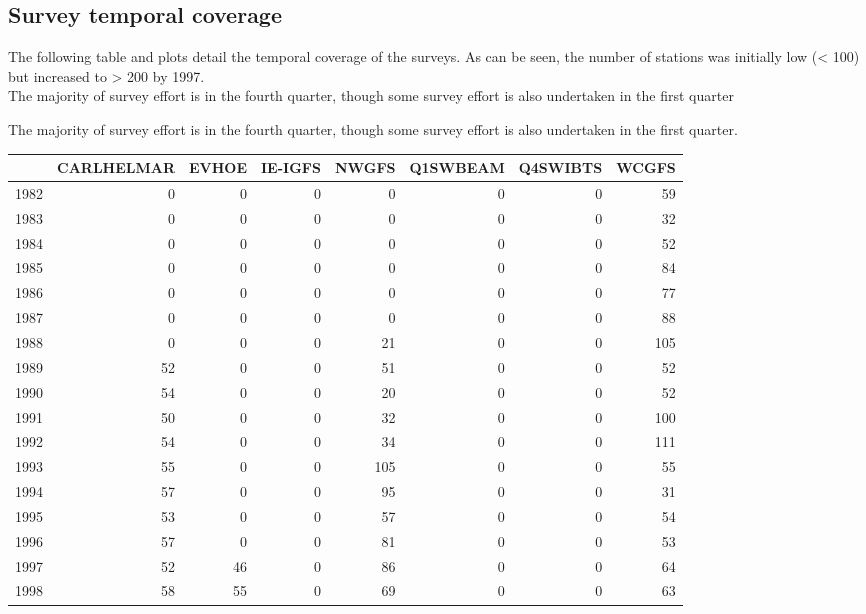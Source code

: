 \documentclass[12pt]{article}\usepackage[]{graphicx}\usepackage[]{color}
\newenvironment{knitrout}{}{} %
\begin{document}
\subsection{Survey temporal coverage}

The following table and plots detail the temporal coverage of the surveys. As
can be seen, the number of stations was initially low (< 100) but increased to
> 200 by 1997.\\

The majority of survey effort is in the fourth quarter, though some survey
effort is also undertaken in the first quarter

The majority of survey effort is in the fourth quarter, though some survey
effort is also undertaken in the first quarter. \\ 

\begin{knitrout}\footnotesize
{}\color{fgcolor}
\begin{tabular}{l|r|r|r|r|r|r|r}
\hline
  & CARLHELMAR & EVHOE & IE-IGFS & NWGFS & Q1SWBEAM & Q4SWIBTS & WCGFS\\
\hline
1982 & 0 & 0 & 0 & 0 & 0 & 0 & 59\\
\hline
1983 & 0 & 0 & 0 & 0 & 0 & 0 & 32\\
\hline
1984 & 0 & 0 & 0 & 0 & 0 & 0 & 52\\
\hline
1985 & 0 & 0 & 0 & 0 & 0 & 0 & 84\\
\hline
1986 & 0 & 0 & 0 & 0 & 0 & 0 & 77\\
\hline
1987 & 0 & 0 & 0 & 0 & 0 & 0 & 88\\
\hline
1988 & 0 & 0 & 0 & 21 & 0 & 0 & 105\\
\hline
1989 & 52 & 0 & 0 & 51 & 0 & 0 & 52\\
\hline
1990 & 54 & 0 & 0 & 20 & 0 & 0 & 52\\
\hline
1991 & 50 & 0 & 0 & 32 & 0 & 0 & 100\\
\hline
1992 & 54 & 0 & 0 & 34 & 0 & 0 & 111\\
\hline
1993 & 55 & 0 & 0 & 105 & 0 & 0 & 55\\
\hline
1994 & 57 & 0 & 0 & 95 & 0 & 0 & 31\\
\hline
1995 & 53 & 0 & 0 & 57 & 0 & 0 & 54\\
\hline
1996 & 57 & 0 & 0 & 81 & 0 & 0 & 53\\
\hline
1997 & 52 & 46 & 0 & 86 & 0 & 0 & 64\\
\hline
1998 & 58 & 55 & 0 & 69 & 0 & 0 & 63\\

\end{tabular}
\end{knitrout}
\end{document}
